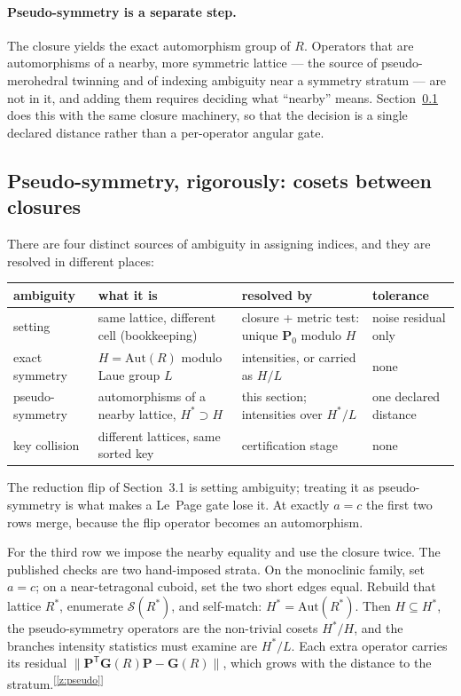 \documentclass[11pt]{article}
\newcommand{\Gmet}{\mathbf{G}}
\newcommand{\Pop}{\mathbf{P}}
\newcommand{\Sclosure}{\mathcal{S}}
\newcommand{\chk}[1]{\textsuperscript{[\ref{#1}]}}
\begin{document}
\paragraph{Pseudo-symmetry is a separate step.}
The closure yields the exact automorphism group of $R$. Operators that are automorphisms of a nearby, more symmetric lattice --- the source of pseudo-merohedral twinning and of indexing ambiguity near a symmetry stratum --- are not in it, and adding them requires deciding what ``nearby'' means. Section~\ref{sec:pseudo} does this with the same closure machinery, so that the decision is a single declared distance rather than a per-operator angular gate.

\subsection{Pseudo-symmetry, rigorously: cosets between closures}
\label{sec:pseudo}

There are four distinct sources of ambiguity in assigning indices, and they are resolved in different places:

\begin{center}\small
\begin{tabular}{p{2.4cm}p{4.2cm}p{4.6cm}p{2.2cm}}
\toprule
ambiguity & what it is & resolved by & tolerance \\
\midrule
setting & same lattice, different cell (bookkeeping) & closure + metric test: unique $\Pop_0$ modulo $H$ & noise residual only \\
exact symmetry & $H=\mathrm{Aut}(R)$ modulo Laue group $L$ & intensities, or carried as $H/L$ & none \\
pseudo-symmetry & automorphisms of a nearby lattice, $H^*\supset H$ & this section; intensities over $H^*/L$ & one declared distance \\
key collision & different lattices, same sorted key & certification stage & none \\
\bottomrule
\end{tabular}
\end{center}

The reduction flip of Section~3.1 is setting ambiguity; treating it as pseudo-symmetry is what makes a Le~Page gate lose it. At exactly $a=c$ the first two rows merge, because the flip operator becomes an automorphism.

For the third row we impose the nearby equality and use the closure twice. The published checks are two hand-imposed strata. On the monoclinic family, set $a=c$; on a near-tetragonal cuboid, set the two short edges equal. Rebuild that lattice $R^*$, enumerate $\Sclosure(R^*)$, and self-match: $H^*=\mathrm{Aut}(R^*)$. Then $H\subseteq H^*$, the pseudo-symmetry operators are the non-trivial cosets $H^*/H$, and the branches intensity statistics must examine are $H^*/L$. Each extra operator carries its residual $\|\Pop^{\mathsf T}\Gmet(R)\Pop-\Gmet(R)\|$, which grows with the distance to the stratum.\chk{z:pseudo}
\end{document}
